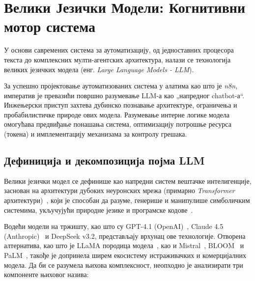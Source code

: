 \newpage



\section{Велики Језички Модели: Когнитивни мотор система}

У основи савремених система за аутоматизацију, од једноставних процесора текста до комплексних мулти-агентских архитектура, налази се технологија великих језичких модела (енг. \textit{Large Language Models - LLM}).

За успешно пројектовање аутоматизованих система у алатима као што је \textit{n8n}, императив је превазићи површно разумевање LLM-а као „напредног chatbot-а“. Инжењерски приступ захтева дубинско познавање архитектуре, ограничења и пробабилистичке природе ових модела. Разумевање интерне логике модела омогућава предвиђање понашања система, оптимизацију потрошње ресурса (токена) и имплементацију механизама за контролу грешака.

\subsection{Дефиниција и декомпозиција појма LLM}

Велики језички модел се дефинише као напредни систем вештачке интелигенције, заснован на архитектури дубоких неуронских мрежа (примарно \textit{Transformer} архитектури)~\cite{vaswani2017,goodfellow2016}, који је способан да разуме, генерише и манипулише симболичким системима, укључујући природне језике и програмске кодове~\cite{devlin2019,brown2020}.

Водећи модели на тржишту, као што су GPT-4.1 (OpenAI)~\cite{openai2023gpt4,bubeck2023}, Claude 4.5 (Anthropic)~\cite{anthropic2024claude} и DeepSeek v3.2, представљају врхунац ове технологије. Отворена алтернатива, као што је LLaMA породица модела~\cite{touvron2023}, као и Mistral~\cite{jiang2023mistral}, BLOOM~\cite{bigscience2022bloom} и PaLM~\cite{chowdhery2022palm}, такође је допринела ширем екосистему истраживачких и комерцијалних модела. Да би се разумела њихова комплексност, неопходно је анализирати три компоненте њиховог назива:

